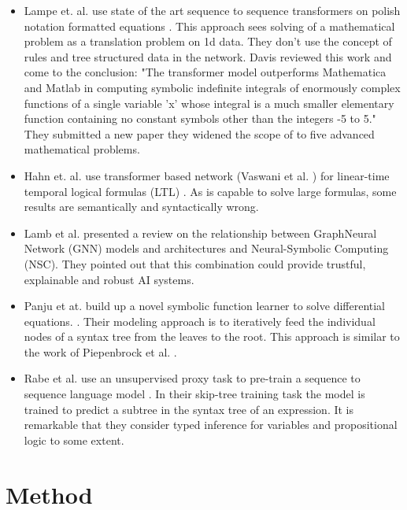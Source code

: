 \documentclass{scrartcl}
\theoremstyle{definition}
\begin{document}
\begin{itemize}
	\item Lampe et. al. use state of the art sequence to sequence transformers on polish notation formatted equations \cite{Lample2020Deep}.
	This approach sees solving of a mathematical problem as a translation problem on 1d data.
	They don't use the concept of rules and tree structured data in the network.
	Davis reviewed this work and come to the conclusion:
	"The transformer model outperforms Mathematica and Matlab in computing symbolic indefinite integrals of enormously complex functions of a single variable 'x' whose integral is a much smaller elementary function containing no constant symbols other than the integers -5 to 5."
	\cite{davis2019use}
	They submitted a new paper \cite{charton2021learning} they widened the scope of to five advanced mathematical problems.
	\item Hahn et. al. use transformer based network (Vaswani et al. \cite{vaswani2017attention}) for linear-time temporal logical formulas (LTL) \cite{hahn2021teaching}.
	As is capable to solve large formulas, some results are semantically and syntactically wrong.
	\item Lamb et al. presented a review on the relationship between GraphNeural Network (GNN) models and architectures and Neural-Symbolic Computing (NSC). \cite{lamb2020graph}
	They pointed out that this combination could provide trustful, explainable and robust AI systems.
	\item Panju et at. build up a novel symbolic function learner to solve differential equations. \cite{panju2020neurosymbolic}.
	Their modeling approach is to iteratively feed the individual nodes of a syntax tree from the leaves to the root.
	This approach is similar to the work of Piepenbrock et al. \cite{piepenbrock2021learning}. 
	\item Rabe et al. use an unsupervised proxy task to pre-train a sequence to sequence language model \cite{rabe2020mathematical}.
	In their skip-tree training task the model is trained to predict a subtree in the syntax tree of an expression.
	It is remarkable that they consider typed inference for variables and propositional logic to some extent.
\end{itemize}

\section{Method}
\end{document}
